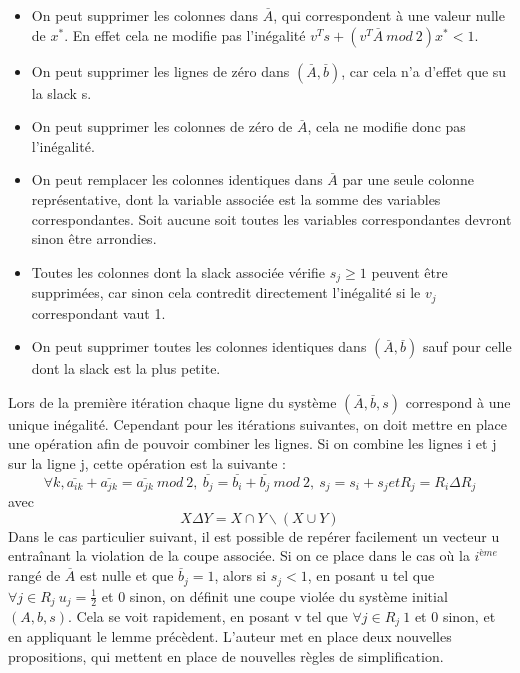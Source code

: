 \documentclass[12pt]{report}
\begin{document}
\begin{itemize}
    \item On peut supprimer les colonnes dans $\overset{\_}{A}$, qui correspondent à une valeur nulle de $x^\ast$. En effet cela ne modifie pas l'inégalité $v^Ts+(v^T\overset{\_}{A}\ mod\ 2)x^\ast < 1 $.
    \item On peut supprimer les lignes de zéro dans $(\overset{\_}{A},\overset{\_}{b})$, car cela n'a d'effet que su la slack s.
    \item On peut supprimer les colonnes de zéro de $\overset{\_}{A}$, cela ne modifie donc pas l'inégalité.
    \item On peut remplacer les colonnes identiques dans $\overset{\_}{A}$ par une seule colonne représentative, dont la variable associée est la somme des variables correspondantes. Soit aucune soit toutes les variables correspondantes devront sinon être arrondies.
    \item Toutes les colonnes dont la slack associée vérifie $s_j\ge1$ peuvent être supprimées, car sinon cela contredit directement l'inégalité si le $v_j$ correspondant vaut 1.
    \item On peut supprimer toutes les colonnes identiques dans $(\overset{\_}{A},\overset{\_}{b})$ sauf pour celle dont la slack est la plus petite.
\end{itemize}
Lors de la première itération chaque ligne du système $(\overset{\_}{A},\overset{\_}{b},s)$ correspond à une unique inégalité. Cependant pour les itérations suivantes, on doit mettre en place une opération afin de pouvoir combiner les lignes.
Si on combine les lignes i et j sur la ligne j, cette opération est la suivante :
$$
\forall k, \overset{\_}{a_{ik}}+\overset{\_}{a_{jk}}=\overset{\_}{a_{jk}} \ mod \ 2, \ \overset{\_}{b_{j}}=\overset{\_}{b_{i}}+\overset{\_}{b_{j}} \ mod \ 2, \ s_j=s_i+s_j et R_j=R_i\Delta R_j
$$
avec
$$
X\Delta Y= X\cap Y \backslash (X \cup Y)
$$
Dans le cas particulier suivant, il est possible de repérer facilement un vecteur u entraînant la violation de la coupe associée. Si on ce place dans le cas où la $i^{ème}$ rangé de $\overset{\_}{A}$ est nulle et que $\overset{\_}{b}_j = 1$, alors si $s_j<1$, en posant u tel que $\forall j \in R_j \ u_j=\frac{1}{2} $ et 0 sinon, on définit une coupe violée du système initial $(A,b,s)$. Cela se voit rapidement, en posant v tel que $\forall j \in R_j \ 1  $ et 0 sinon, et en appliquant le lemme précèdent. 
\newline
\newline
L'auteur met en place deux nouvelles propositions, qui mettent en place de nouvelles règles de simplification.
\end{document}
